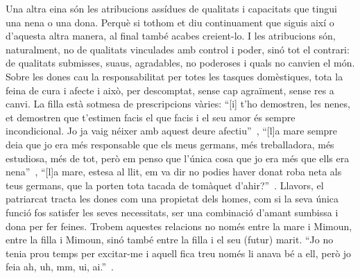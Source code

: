 Una altra eina són les atribucions assídues de qualitats i capacitats que tingui una nena o una dona.
Perquè si tothom et diu continuament que siguis així o d'aquesta altra manera, al final també acabes creient-lo.
I les atribucions són, naturalment, no de qualitats vinculades amb control i poder, sinó tot el contrari: de qualitats submisses, suaus, agradables, no poderoses i quals no canvien el món.
Sobre les dones cau la responsabilitat per totes les tasques domèstiques, tota la feina de cura i afecte i això, per descomptat, sense cap agraïment, sense res a canvi.
La filla està sotmesa de prescripcions vàries:
``[i] t'ho demostren, les nenes, et demostren que t'estimen facis el que facis i el seu amor és sempre incondicional. Jo ja vaig néixer amb aquest deure afectiu''~\autocite[147]{ElHachmi2008},
``[l]a mare sempre deia que jo era més responsable que els meus germans, més treballadora, més estudiosa, més de tot, però em penso que l'única cosa que jo era més que ells era nena''~\autocite[191]{ElHachmi2008},
``[l]a mare, estesa al llit, em va dir no podies haver donat roba neta als teus germans, que la porten tota tacada de tomàquet d'ahir?''~\autocite[220]{ElHachmi2008}.
Llavors, el patriarcat tracta les dones com una propietat dels homes, com si la seva única funció fos satisfer les seves necessitats, ser una combinació d'amant sumbissa i dona per fer feines.
Trobem aquestes relacions no només entre la mare i Mimoun, entre la filla i Mimoun, sinó també entre la filla i el seu (futur) marit.
``Jo no tenia prou temps per excitar-me i aquell fica treu només li anava bé a ell, però jo feia ah, uh, mm, ui, ai.''~\autocite[306]{ElHachmi2008}.

